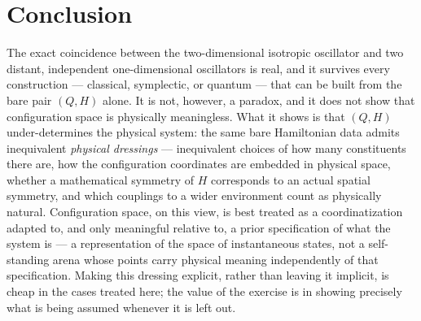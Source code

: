 \documentclass[11pt]{article}
\begin{document}
\section{Conclusion}

The exact coincidence between the two-dimensional isotropic oscillator and two distant, independent one-dimensional oscillators is real, and it survives every construction --- classical, symplectic, or quantum --- that can be built from the bare pair $(Q,H)$ alone. It is not, however, a paradox, and it does not show that configuration space is physically meaningless. What it shows is that $(Q,H)$ under-determines the physical system: the same bare Hamiltonian data admits inequivalent \emph{physical dressings} --- inequivalent choices of how many constituents there are, how the configuration coordinates are embedded in physical space, whether a mathematical symmetry of $H$ corresponds to an actual spatial symmetry, and which couplings to a wider environment count as physically natural. Configuration space, on this view, is best treated as a coordinatization adapted to, and only meaningful relative to, a prior specification of what the system is --- a representation of the space of instantaneous states, not a self-standing arena whose points carry physical meaning independently of that specification. Making this dressing explicit, rather than leaving it implicit, is cheap in the cases treated here; the value of the exercise is in showing precisely what is being assumed whenever it is left out.
\end{document}
